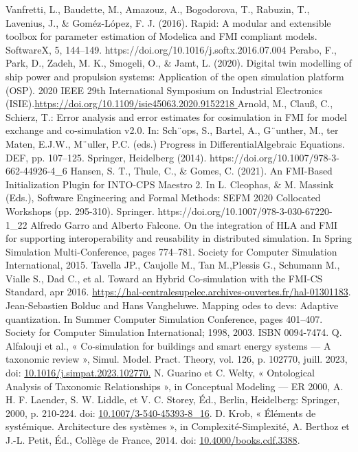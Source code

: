 \begin{thebibliography}{1}
  Vanfretti, L., Baudette, M., Amazouz, A., Bogodorova, T., Rabuzin, T., Lavenius, J., \& Goméz-López, F. J. (2016). Rapid: A modular and extensible toolbox for parameter estimation of Modelica and FMI compliant models. SoftwareX, 5, 144–149. https://doi.org/10.1016/j.softx.2016.07.004 
  Perabo, F., Park, D., Zadeh, M. K., Smogeli, O., \& Jamt, L. (2020). Digital twin modelling of ship power and propulsion systems: Application of the open simulation platform (OSP). 2020 IEEE 29th International Symposium on Industrial Electronics (ISIE).\url{https://doi.org/10.1109/isie45063.2020.9152218 }
  Arnold, M., Clauß, C., Schierz, T.: Error analysis and error estimates for cosimulation in FMI for model exchange and co-simulation v2.0. In: Sch¨ops, S., Bartel, A., G¨unther, M., ter Maten, E.J.W., M¨uller, P.C. (eds.) Progress in DifferentialAlgebraic Equations. DEF, pp. 107–125. Springer, Heidelberg (2014). https://doi.org/10.1007/978-3-662-44926-4\_6
  Hansen, S. T., Thule, C., \& Gomes, C. (2021). An FMI-Based Initialization Plugin for INTO-CPS Maestro 2. In L. Cleophas, \& M. Massink (Eds.), Software Engineering and Formal Methods: SEFM 2020 Collocated Workshops (pp. 295-310). Springer. https://doi.org/10.1007/978-3-030-67220-1\_22
  Alfredo Garro and Alberto Falcone. On the integration of HLA and FMI for supporting interoperability and reusability in distributed simulation. In Spring Simulation Multi-Conference, pages 774–781. Society for Computer Simulation International, 2015.
  Tavella JP., Caujolle M., Tan M.,Plessis G., Schumann M., Vialle S., Dad C., et al. Toward an Hybrid Co-simulation with the FMI-CS Standard, apr 2016. \url{ https://hal-centralesupelec.archives-ouvertes.fr/hal-01301183}.
  Jean-Sebastien Bolduc and Hans Vangheluwe. Mapping odes to devs: Adaptive quantization. In Summer Computer Simulation Conference, pages 401–407. Society for Computer Simulation International; 1998, 2003. ISBN 0094-7474.
  Q. Alfalouji et al., « Co-simulation for buildings and smart energy systems — A taxonomic review », Simul. Model. Pract. Theory, vol. 126, p. 102770, juill. 2023, doi: \url{10.1016/j.simpat.2023.102770.}
  N. Guarino et C. Welty, « Ontological Analysis of Taxonomic Relationships », in Conceptual Modeling — ER 2000, A. H. F. Laender, S. W. Liddle, et V. C. Storey, Éd., Berlin, Heidelberg: Springer, 2000, p. 210‑224. doi: \url{10.1007/3-540-45393-8_16}.
  D. Krob, « Éléments de systémique. Architecture des systèmes », in Complexité-Simplexité, A. Berthoz et J.-L. Petit, Éd., Collège de France, 2014. doi: \url{10.4000/books.cdf.3388}.

\end{thebibliography}
